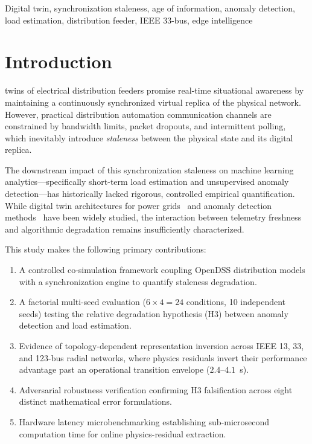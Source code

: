 \documentclass[journal]{IEEEtran}
\begin{document}
\begin{IEEEkeywords}
Digital twin, synchronization staleness, age of information, anomaly detection, load estimation, distribution feeder, IEEE 33-bus, edge intelligence
\end{IEEEkeywords}


\section{Introduction}
\label{sec:introduction}

 twins of electrical distribution feeders promise real-time situational awareness by maintaining a continuously synchronized virtual replica of the physical network. However, practical distribution automation communication channels are constrained by bandwidth limits, packet dropouts, and intermittent polling, which inevitably introduce \emph{staleness} between the physical state and its digital replica.

The downstream impact of this synchronization staleness on machine learning analytics---specifically short-term load estimation and unsupervised anomaly detection---has historically lacked rigorous, controlled empirical quantification. While digital twin architectures for power grids~\cite{ref_dt_survey} and anomaly detection methods~\cite{ref_ad_survey} have been widely studied, the interaction between telemetry freshness and algorithmic degradation remains insufficiently characterized.

This study makes the following primary contributions:
\begin{enumerate}
    \item A controlled co-simulation framework coupling OpenDSS distribution models with a synchronization engine to quantify staleness degradation.
    \item A factorial multi-seed evaluation ($6 \times 4 = 24$ conditions, 10 independent seeds) testing the relative degradation hypothesis (H3) between anomaly detection and load estimation.
    \item Evidence of topology-dependent representation inversion across IEEE 13, 33, and 123-bus radial networks, where physics residuals invert their performance advantage past an operational transition envelope ($2.4$--$4.1$~s).
    \item Adversarial robustness verification confirming H3 falsification across eight distinct mathematical error formulations.
    \item Hardware latency microbenchmarking establishing sub-microsecond computation time for online physics-residual extraction.
\end{enumerate}
\end{document}
